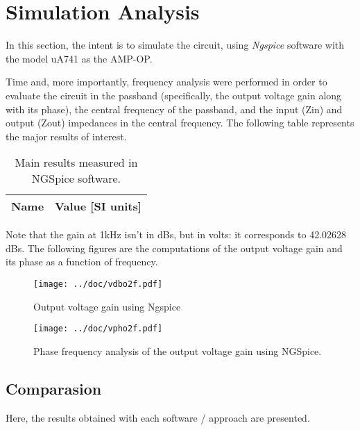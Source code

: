 \section{Simulation Analysis}
\label{sec:simulation}

In this section, the intent is to simulate the circuit, using \textit{Ngspice} software with the model uA741 as the AMP-OP.

Time and, more importantly, frequency analysis were performed in order to evaluate the circuit in the passband (specifically, the output voltage gain along with its phase), the central frequency of the passband, and the input (Zin) and output (Zout) impedances in the central frequency. The following table represents the major results of interest.

\begin{table}[h]
    \centering
    \begin{tabular}{|l|r|}
      \hline    
      {\bf Name} & {\bf Value [SI units]} \\ \hline
      
      
      
    \end{tabular}
    \caption{Main results measured in NGSpice software.}
 \end{table}

Note that the gain at 1kHz isn't in dBs, but in volts: it corresponds to 42.02628 dBs.
The following figures are the computations of the output voltage gain and its phase as a function of frequency.

\begin{figure}[!htb]
    \centering
    \texttt{[image: ../doc/vdbo2f.pdf]}
    \caption{Output voltage gain using Ngspice}
\end{figure}

\begin{figure}[!htb]
    \centering
    \texttt{[image: ../doc/vpho2f.pdf]}
    \caption{Phase frequency analysis of the output voltage gain using NGSpice.}
\end{figure}



\clearpage

\subsection{Comparasion}
\label{sec:comparasion}

Here, the results obtained with each software / approach are presented.

